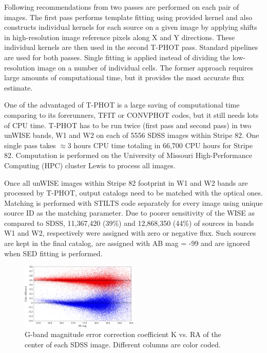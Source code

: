 \documentclass[apj,iop]{emulateapj}
\begin{document}
Following recommendations from \citet{Merlin2016a} two passes are performed on each pair of images. The first pass performs template fitting using provided kernel and also constructs individual kernels for each source on a given image by applying shifts in high-resolution image reference pixels along X and Y directions. These individual kernels are then used in the second T-PHOT pass. Standard pipelines are used for both passes. Single fitting is applied instead of dividing the low-resolution image on a number of individual cells. The former approach requires large amounts of computational time, but it provides the most accurate flux estimate.

One of the advantaged of T-PHOT is a large saving of computational time comparing to its forerunners, TFIT or CONVPHOT codes, but it still needs lots of CPU time. T-PHOT has to be run twice (first pass and second pass) in two unWISE bands, W1 and W2 on each of 5556 SDSS images within Stripe 82. One single pass takes $\approx3$ hours CPU time totaling in 66,700 CPU hours for Stripe 82. Computation is performed on the University of Missouri High-Performance Computing (HPC) cluster Lewis to process all images. 

Once all unWISE images within Stripe 82 footprint in W1 and W2 bands are processed by T-PHOT, output catalogs need to be matched with the optical ones. Matching is performed with STILTS code separately for every image using unique source ID as the matching parameter. Due to poorer sensitivity of the WISE as compared to SDSS, 11,367,420 (39\%) and 12,868,350 (44\%) of sources in bands W1 and W2, respectively were assigned with zero or negative flux. Such sources are kept in the final catalog, are assigned with AB mag = -99 and are ignored when SED fitting is performed.


\begin{figure}[!h]
\includegraphics[width=0.5\textwidth]{figures/figure_color_comparison.png}
\caption{G-band magnitude error correction coefficient K vs. RA of the center of each SDSS image. Different columns are color coded.}
\label{fig:color}
\end{figure}
\end{document}
